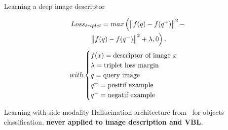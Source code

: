 \begin{frame}{Learning a deep image descriptor}
\begin{minipage}{0.49\linewidth}
\begin{minipage}{0.7\linewidth}
\begin{figure}
			\end{figure}
			\vfill
		\end{minipage}
	\end{minipage}
	\begin{minipage}{0.48\linewidth}
		\begin{multline}
			\label{eq:triplet_loss}
			Loss_{triplet} = max\left( \left\lVert f(q) - f(q^+)\right\rVert^2 - \right. \\
			\left. \left\lVert f(q) - f(q^-)\right\rVert^2 + \lambda, 0\right),
		\end{multline}
		\vfill
		\begin{align*}
		with 
		\begin{cases}
				f(x) = \textnormal{descriptor of image $x$ } \\
				\lambda = \textnormal{triplet loss margin} \\
				q = \textnormal{query image} \\
				q^+ = \textnormal{positif example} \\
				q^- = \textnormal{negatif example} \\
		\end{cases}
		\end{align*}
	\end{minipage}
	
\end{frame}


\begin{frame}{Learning with side modality}
	Hallucination architecture from~\cite{Hoffman2016} for objects classification, \textbf{never applied to image description and VBL}.
	\begin{figure}
		\centering
	\end{figure}
\end{frame}
